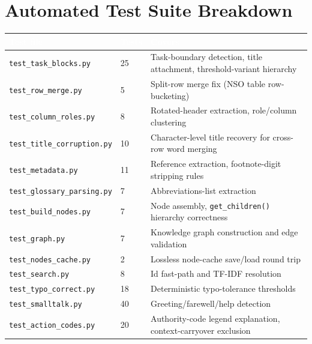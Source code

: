 \chapter{Automated Test Suite Breakdown}
\label{ch:automated-test-suite-breakdown}
\begin{longtable}{|p{}|p{}|p{}|}
\hline
\rowcolor{thesisgreen}\textcolor{white}{\textbf{Test file}} & \textcolor{white}{\textbf{Tests}} & \textcolor{white}{\textbf{Covers}} \\
\hline\endhead
\texttt{test\_\allowbreak{}task\_\allowbreak{}blocks.py} & 25 & Task-boundary detection, title attachment, threshold-variant hierarchy \\
\hline
\texttt{test\_\allowbreak{}row\_\allowbreak{}merge.py} & 5 & Split-row merge fix (NSO table row-bucketing) \\
\hline
\texttt{test\_\allowbreak{}column\_\allowbreak{}roles.py} & 8 & Rotated-header extraction, role/column clustering \\
\hline
\texttt{test\_\allowbreak{}title\_\allowbreak{}corruption.py} & 10 & Character-level title recovery for cross-row word merging \\
\hline
\texttt{test\_\allowbreak{}metadata.py} & 11 & Reference extraction, footnote-digit stripping rules \\
\hline
\texttt{test\_\allowbreak{}glossary\_\allowbreak{}parsing.py} & 7 & Abbreviations-list extraction \\
\hline
\texttt{test\_\allowbreak{}build\_\allowbreak{}nodes.py} & 7 & Node assembly, \texttt{get\_\allowbreak{}children()} hierarchy correctness \\
\hline
\texttt{test\_\allowbreak{}graph.py} & 7 & Knowledge graph construction and edge validation \\
\hline
\texttt{test\_\allowbreak{}nodes\_\allowbreak{}cache.py} & 2 & Lossless node-cache save/load round trip \\
\hline
\texttt{test\_\allowbreak{}search.py} & 8 & Id fast-path and TF-IDF resolution \\
\hline
\texttt{test\_\allowbreak{}typo\_\allowbreak{}correct.py} & 18 & Deterministic typo-tolerance thresholds \\
\hline
\texttt{test\_\allowbreak{}smalltalk.py} & 40 & Greeting/farewell/help detection \\
\hline
\texttt{test\_\allowbreak{}action\_\allowbreak{}codes.py} & 20 & Authority-code legend explanation, context-carryover exclusion \\

\end{longtable}

